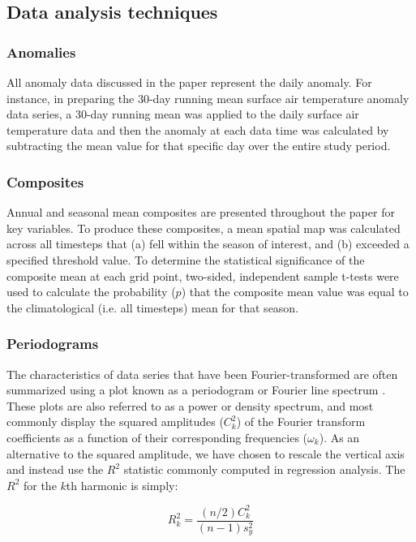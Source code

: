 \subsection{Data analysis techniques}

\subsubsection{Anomalies}
All anomaly data discussed in the paper represent the daily anomaly. For instance, in preparing the 30-day running mean surface air temperature anomaly data series, a 30-day running mean was applied to the daily surface air temperature data and then the anomaly at each data time was calculated by subtracting the mean value for that specific day over the entire study period.

\subsubsection{Composites}
Annual and seasonal mean composites are presented throughout the paper for key variables. To produce these composites, a mean spatial map was calculated across all timesteps that (a) fell within the season of interest, and (b) exceeded a specified threshold value. To determine the statistical significance of the composite mean at each grid point, two-sided, independent sample t-tests were used to calculate the probability ($p$) that the composite mean value was equal to the climatological (i.e. all timesteps) mean for that season.

\subsubsection{Periodograms}
The characteristics of data series that have been Fourier-transformed are often summarized using a plot known as a periodogram or Fourier line spectrum \citep{Wilks2011}. These plots are also referred to as a power or density spectrum, and most commonly display the squared amplitudes ($C_k^2$) of the Fourier transform coefficients as a function of their corresponding frequencies ($\omega_k$). As an alternative to the squared amplitude, we have chosen to rescale the vertical axis and instead use the $R^2$ statistic commonly computed in regression analysis. The $R^2$ for the $k$th harmonic is simply:

\begin{equation}\label{eq:variance_explained}
R_k^2 = \frac{(n/2)C_k^2}{(n-1)s_y^2}
\end{equation}

